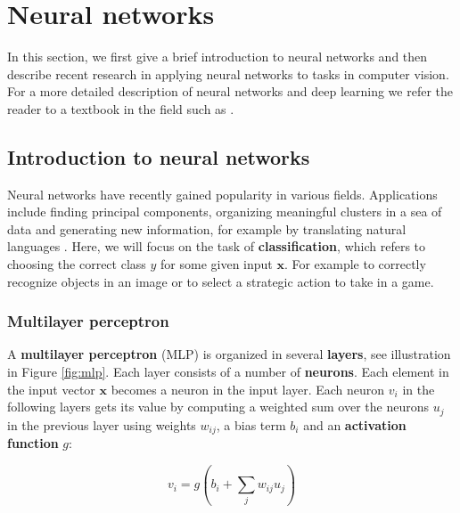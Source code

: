 

\section{Neural networks}
\label{sec:networks}
In this section, we first give a brief introduction to neural networks and then describe recent research in applying neural networks to tasks in computer vision.
For a more detailed description of neural networks and deep learning we refer the reader to a textbook in the field such as \cite{GoodfellowBook}.

\subsection{Introduction to neural networks}

Neural networks have recently gained popularity in various fields.
Applications include finding principal components, organizing meaningful clusters in a sea of data and generating new information, for example by translating natural languages \cite{machine_translation_attention}. Here, we will focus on the task of \textbf{classification}, which refers to choosing the correct class $y$ for some given input $\mathbf{x}$. For example to correctly recognize objects in an image or to select a strategic action to take in a game.

\subsubsection{Multilayer perceptron}



A \textbf{multilayer perceptron} (MLP) is organized in several \textbf{layers}, see illustration in Figure \ref{fig:mlp}. Each layer consists of a number of \textbf{neurons}.
Each element in the input vector $\mathbf{x}$ becomes a neuron in the input layer. Each neuron $v_i$ in the following layers gets its value by computing a weighted sum over the neurons $u_j$ in the previous layer using weights  $w_{ij}$, a bias term $b_i$ and an \textbf{activation function} $g$:

\[
v_i = g\left( b_i + \sum_j w_{ij} u_j \right)
\]

